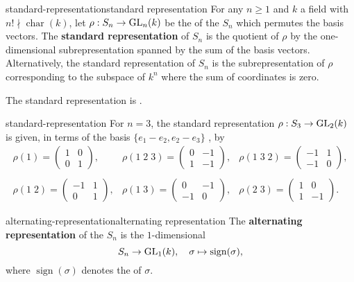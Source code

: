 \begin{topic}{standard-representation}{standard representation}
    For any $n \ge 1$ and $k$ a field with $n! \nmid \operatorname{char}(k)$, let $\rho : S_n \to \textup{GL}_n(k)$ be the  of the  $S_n$ which permutes the basis vectors. The \textbf{standard representation} of $S_n$ is the quotient of $\rho$ by the one-dimensional subrepresentation spanned by the sum of the basis vectors. Alternatively, the standard representation of $S_n$ is the subrepresentation of $\rho$ corresponding to the subspace of $k^n$ where the sum of coordinates is zero.
    
    The standard representation is .
\end{topic}

\begin{example}{standard-representation}
    For $n = 3$, the standard representation $\rho : S_3 \to \textup{GL}_2(k)$ is given, in terms of the basis $\{ e_1 - e_2, e_2 - e_3 \}$ , by
    \[ \begin{array}{ccc}
        \rho(1) = \begin{pmatrix} 1 & 0 \\ 0 & 1 \end{pmatrix}, &
        \rho(1 \; 2 \; 3) = \begin{pmatrix} 0 & -1 \\ 1 & -1 \end{pmatrix}, &
        \rho(1 \; 3 \; 2) = \begin{pmatrix} -1 & 1 \\ -1 & 0 \end{pmatrix}, \\ & & \\
        \rho(1 \; 2) = \begin{pmatrix} -1 & 1 \\ 0 & 1 \end{pmatrix}, &
        \rho(1 \; 3) = \begin{pmatrix} 0 & -1 \\ -1 & 0 \end{pmatrix}, &
        \rho(2 \; 3) = \begin{pmatrix} 1 & 0 \\ 1 & -1 \end{pmatrix} .
    \end{array} \]
\end{example}

\begin{topic}{alternating-representation}{alternating representation}
    The \textbf{alternating representation} of the  $S_n$ is the $1$-dimensional 
    \[ S_n \to \textup{GL}_1(k), \quad \sigma \mapsto \operatorname{sign}(\sigma), \]
    where $\operatorname{sign}(\sigma)$ denotes the  of $\sigma$.
\end{topic}


